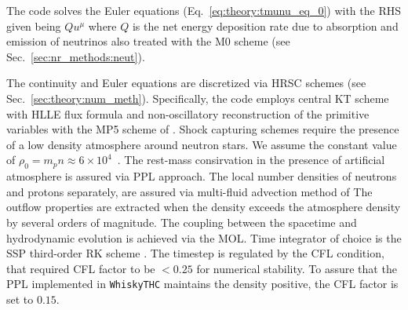 The code solves the Euler equations (Eq.~\eqref{eq:theory:tmunu_eq_0}) 
with the \ac{RHS} given being $ Q u^{\mu}$
%
%
%
where $Q$ is the net energy deposition rate due to absorption
and emission of neutrinos also treated with the M0 scheme  
(see Sec.~\ref{sec:nr_methods:neut}).




The continuity and Euler equations are discretized via \ac{HRSC} schemes
(see Sec.~\ref{sec:theory:num_meth}).
%
Specifically, the code employs central \ac{KT} scheme \citep{Kurganov:2000} with 
\ac{HLLE} flux formula \citep{Einfeldt:1988} and non-oscillatory reconstruction 
of the primitive variables with the \ac{MP5} scheme of \citep{Suresh:1997}.
%
Shock capturing schemes require the presence of a low density atmosphere around neutron stars.
We assume the constant value of $\rho_0 = m_p n \approx 6\times 10^4$~\gcm.
%
The rest-mass consirvation in the presence of artificial atmosphere is assured via 
\ac{PPL} approach.
%
The local number densities of neutrons and protons separately, are assured via 
multi-fluid advection method of \citet{Plewa:1998nma}
%
The outflow properties are extracted when the density exceeds the atmosphere density
by several orders of magnitude.
%
The coupling between the spacetime and hydrodynamic evolution is achieved via 
the \ac{MOL}.
%
Time integrator of choice is the \ac{SSP} third-order \ac{RK} scheme \citep{Gottlieb:2009}.
The timestep is regulated by the \ac{CFL} condition, that required \ac{CFL} factor 
to be $<0.25$ for numerical stability. 
To assure that the \ac{PPL} implemented in \texttt{WhiskyTHC} maintains 
the density positive, the \ac{CFL} factor is set to $0.15$.


